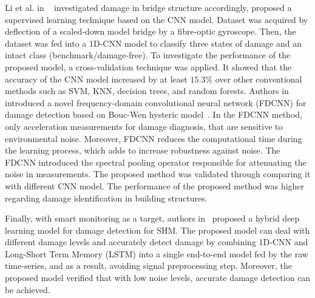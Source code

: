 Li et al. in ~\cite{Li2020a} investigated damage in bridge structure accordingly, proposed a supervised learning technique based on the CNN model.
Dataset was acquired by deflection of a scaled-down model bridge by a fibre-optic gyroscope.
Then, the dataset was fed into a 1D-CNN model to classify three states of damage and an intact class (benchmark/damage-free).
To investigate the performance of the proposed model, a cross-validation technique was applied. 
It showed that the accuracy of the CNN model increased by at least \(15.3\%\) over other conventional methods such as SVM, KNN, decision trees, and random forests.
Authors in \cite{Lopez-Pacheco2020} introduced a novel frequency-domain convolutional neural network (FDCNN) for damage detection based on Bouc-Wen hysteric model~\cite{Ismail2009}.  
In the FDCNN method, only acceleration measurements for damage diagnosis, that are sensitive to environmental noise.
Moreover, FDCNN reduces the computational time during the learning process, which adds to increase robustness against noise.
The FDCNN introduced the spectral pooling operator responsible for attenuating the noise in measurements.
The proposed method was validated through comparing it with different CNN model. 
The performance of the proposed method was higher regarding damage identification in building structures.

Finally, with smart monitoring as a target, authors in~\cite{Hung2020}  proposed a hybrid deep learning model for damage detection for SHM.
The proposed model can deal with different damage levels and accurately detect damage by combining 1D-CNN and Long-Short Term Memory (LSTM) into a single end-to-end model fed by the raw time-series, and as a result, avoiding signal preprocessing step.
Moreover, the proposed model verified that with low noise levels,  accurate damage detection can be achieved.


